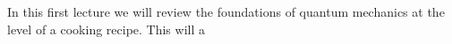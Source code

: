In this first lecture we will review the foundations of quantum mechanics at the level of a cooking recipe. This will a